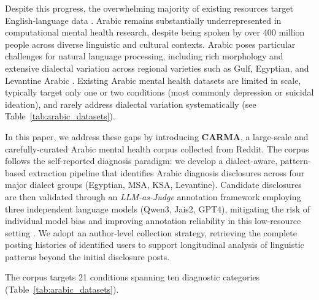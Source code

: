 \documentclass[11pt]{article}
\begin{document}
Despite this progress, the overwhelming majority of existing resources target English-language data \cite{harrigian2021state}. Arabic remains substantially underrepresented in computational mental health research, despite being spoken by over 400 million people across diverse linguistic and cultural contexts. Arabic poses particular challenges for natural language processing, including rich morphology and extensive dialectal variation across regional varieties such as Gulf, Egyptian, and Levantine Arabic \cite{darwish2021panorama,habash2010introduction}. Existing Arabic mental health datasets are limited in scale, typically target only one or two conditions (most commonly depression or suicidal ideation), and rarely address dialectal variation systematically (see Table~\ref{tab:arabic_datasets}).

In this paper, we address these gaps by introducing \textbf{CARMA}, a large-scale and carefully-curated Arabic mental
health corpus collected from Reddit. The corpus follows the self-reported
diagnosis paradigm: we develop a dialect-aware, pattern-based extraction pipeline
that identifies Arabic diagnosis disclosures across four major dialect groups (Egyptian, MSA, KSA, Levantine).
Candidate disclosures are then validated through an \textit{LLM-as-Judge}
annotation framework \cite{zheng2023judging} employing three independent language
models (Qwen3, Jais2, GPT4), mitigating the risk of individual model bias and improving annotation
reliability in this low-resource setting \cite{fu-liu-2025-reliable}. We adopt
an author-level collection strategy, retrieving the complete posting histories of
identified users to support longitudinal analysis of linguistic patterns beyond
the initial disclosure posts.

The corpus targets 21 conditions spanning ten diagnostic
categories (Table~\ref{tab:arabic_datasets}).

\end{document}
